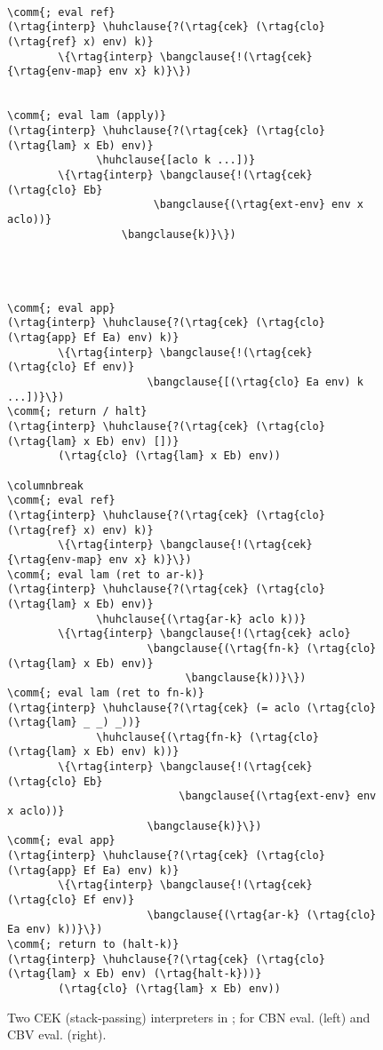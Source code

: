 \begin{figure*}[h]
\vspace{-0.75cm}
\hspace{-0.95cm}  
\begin{minipage}{0.98\linewidth}
\begin{multicols}{2}
\begin{Verbatim}[baselinestretch=.75,commandchars=\\\{\}]
    
\comm{; eval ref}
(\rtag{interp} \huhclause{?(\rtag{cek} (\rtag{clo} (\rtag{ref} x) env) k)}
        \{\rtag{interp} \bangclause{!(\rtag{cek} {\rtag{env-map} env x} k)}\})

      
\comm{; eval lam (apply)}
(\rtag{interp} \huhclause{?(\rtag{cek} (\rtag{clo} (\rtag{lam} x Eb) env)}
              \huhclause{[aclo k ...])}
        \{\rtag{interp} \bangclause{!(\rtag{cek} (\rtag{clo} Eb}
                       \bangclause{(\rtag{ext-env} env x aclo))}
                  \bangclause{k)}\})

                  

                  
\comm{; eval app}
(\rtag{interp} \huhclause{?(\rtag{cek} (\rtag{clo} (\rtag{app} Ef Ea) env) k)}
        \{\rtag{interp} \bangclause{!(\rtag{cek} (\rtag{clo} Ef env)}
                      \bangclause{[(\rtag{clo} Ea env) k ...])}\})
\comm{; return / halt}
(\rtag{interp} \huhclause{?(\rtag{cek} (\rtag{clo} (\rtag{lam} x Eb) env) [])}
        (\rtag{clo} (\rtag{lam} x Eb) env))

\columnbreak
\comm{; eval ref}
(\rtag{interp} \huhclause{?(\rtag{cek} (\rtag{clo} (\rtag{ref} x) env) k)}
        \{\rtag{interp} \bangclause{!(\rtag{cek} {\rtag{env-map} env x} k)}\})
\comm{; eval lam (ret to ar-k)}
(\rtag{interp} \huhclause{?(\rtag{cek} (\rtag{clo} (\rtag{lam} x Eb) env)}
              \huhclause{(\rtag{ar-k} aclo k))}
        \{\rtag{interp} \bangclause{!(\rtag{cek} aclo}
                      \bangclause{(\rtag{fn-k} (\rtag{clo} (\rtag{lam} x Eb) env)}
                            \bangclause{k))}\})
\comm{; eval lam (ret to fn-k)}
(\rtag{interp} \huhclause{?(\rtag{cek} (= aclo (\rtag{clo} (\rtag{lam} _ _) _))}
              \huhclause{(\rtag{fn-k} (\rtag{clo} (\rtag{lam} x Eb) env) k))}
        \{\rtag{interp} \bangclause{!(\rtag{cek} (\rtag{clo} Eb}
                           \bangclause{(\rtag{ext-env} env x aclo))}
                      \bangclause{k)}\})
\comm{; eval app}
(\rtag{interp} \huhclause{?(\rtag{cek} (\rtag{clo} (\rtag{app} Ef Ea) env) k)}
        \{\rtag{interp} \bangclause{!(\rtag{cek} (\rtag{clo} Ef env)}
                      \bangclause{(\rtag{ar-k} (\rtag{clo} Ea env) k))}\})
\comm{; return to (halt-k)}
(\rtag{interp} \huhclause{?(\rtag{cek} (\rtag{clo} (\rtag{lam} x Eb) env) (\rtag{halt-k}))}
        (\rtag{clo} (\rtag{lam} x Eb) env))
\end{Verbatim}
\end{multicols}
\end{minipage}
\caption{Two CEK (stack-passing) interpreters in \slog{}; for CBN eval. (left) and CBV eval. (right).}
\label{fig:cek-machines}
\end{figure*}
